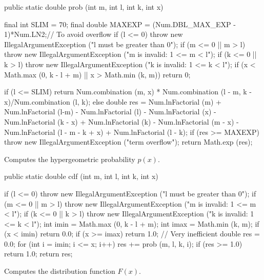 \begin{code}
   public static double prob (int m, int l, int k, int x)\begin{hide} {
      final int SLIM = 70;
      final double MAXEXP = (Num.DBL_MAX_EXP - 1)*Num.LN2;// To avoid overflow
      if (l <= 0)
         throw new IllegalArgumentException ("l must be greater than 0");
      if (m <= 0 || m > l)
         throw new IllegalArgumentException ("m is invalid: 1 <= m < l");
      if (k <= 0 || k > l)
         throw new IllegalArgumentException ("k is invalid: 1 <= k < l");
      if (x < Math.max (0, k - l + m) || x > Math.min (k, m))
         return 0;

      if (l <= SLIM)
         return Num.combination (m, x)
            * Num.combination (l - m, k - x)/Num.combination (l, k);
      else {
         double res =
             Num.lnFactorial (m) + Num.lnFactorial (l-m) - Num.lnFactorial (l)
           - Num.lnFactorial (x) - Num.lnFactorial (k - x) + Num.lnFactorial (k)
           - Num.lnFactorial (m - x) - Num.lnFactorial (l - m - k + x)
           + Num.lnFactorial (l - k);
         if (res >= MAXEXP)
            throw new IllegalArgumentException ("term overflow");
         return Math.exp (res);
      }
   }\end{hide}
\end{code}
 \begin{tabb}
   Computes the hypergeometric probability
   $p(x)$.
 \end{tabb}
\begin{code}

   public static double cdf (int m, int l, int k, int x)\begin{hide} {
      if (l <= 0)
         throw new IllegalArgumentException ("l must be greater than 0");
      if (m <= 0 || m > l)
         throw new IllegalArgumentException ("m is invalid: 1 <= m < l");
      if (k <= 0 || k > l)
         throw new IllegalArgumentException ("k is invalid: 1 <= k < l");
      int imin = Math.max (0, k - l + m);
      int imax = Math.min (k, m);
      if (x < imin)
         return 0.0;
      if (x >= imax)
         return 1.0;
      // Very inefficient
      double res = 0.0;
      for (int i = imin; i <= x; i++)
         res += prob (m, l, k, i);
      if (res >= 1.0)
         return 1.0;
      return res;
   }\end{hide}
\end{code}
  \begin{tabb} Computes the distribution function $F(x)$.
  \end{tabb}
